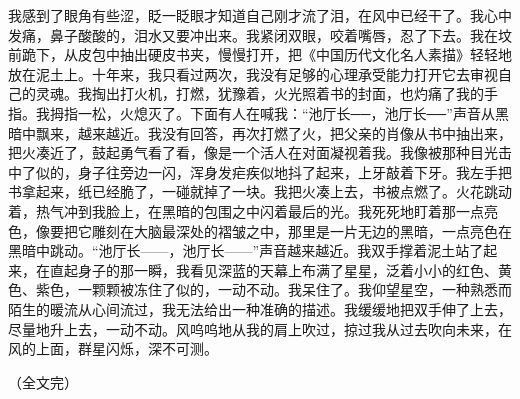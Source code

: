 \documentclass[12pt,oneside]{book}
\begin{document}
我感到了眼角有些涩，眨一眨眼才知道自己刚才流了泪，在风中已经干了。我心中发痛，鼻子酸酸的，泪水又要冲出来。我紧闭双眼，咬着嘴唇，忍了下去。我在坟前跪下，从皮包中抽出硬皮书夹，慢慢打开，把《中国历代文化名人素描》轻轻地放在泥土上。十年来，我只看过两次，我没有足够的心理承受能力打开它去审视自己的灵魂。我掏出打火机，打燃，犹豫着，火光照着书的封面，也灼痛了我的手指。我拇指一松，火熄灭了。下面有人在喊我：``池厅长──，池厅长──''声音从黑暗中飘来，越来越近。我没有回答，再次打燃了火，把父亲的肖像从书中抽出来，把火凑近了，鼓起勇气看了看，像是一个活人在对面凝视着我。我像被那种目光击中了似的，身子往旁边一闪，浑身发疟疾似地抖了起来，上牙敲着下牙。我左手把书拿起来，纸已经脆了，一碰就掉了一块。我把火凑上去，书被点燃了。火花跳动着，热气冲到我脸上，在黑暗的包围之中闪着最后的光。我死死地盯着那一点亮色，像要把它雕刻在大脑最深处的褶皱之中，那里是一片无边的黑暗，一点亮色在黑暗中跳动。``池厅长------，池厅长------''声音越来越近。我双手撑着泥土站了起来，在直起身子的那一瞬，我看见深蓝的天幕上布满了星星，泛着小小的红色、黄色、紫色，一颗颗被冻住了似的，一动不动。我呆住了。我仰望星空，一种熟悉而陌生的暖流从心间流过，我无法给出一种准确的描述。我缓缓地把双手伸了上去，尽量地升上去，一动不动。风呜呜地从我的肩上吹过，掠过我从过去吹向未来，在风的上面，群星闪烁，深不可测。

（全文完）

\backmatter
\end{document}

